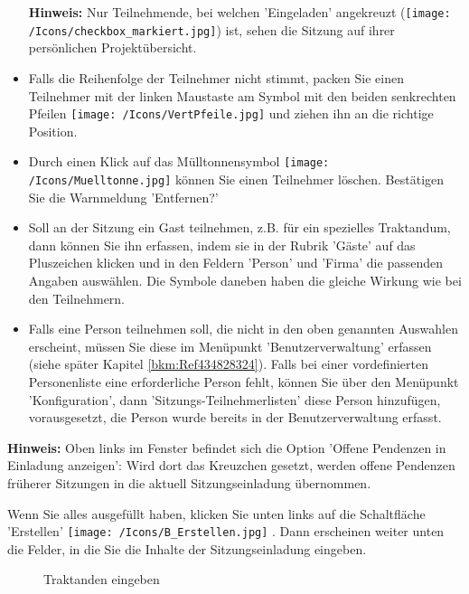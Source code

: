 \begin{itemize}
\textbf{Hinweis:} Nur Teilnehmende, bei welchen 'Eingeladen' angekreuzt (\texttt{[image: /Icons/checkbox\_markiert.jpg]}) ist, sehen die Sitzung auf ihrer persönlichen Projektübersicht.
\item 
Falls die Reihenfolge der Teilnehmer nicht stimmt, packen Sie einen Teilnehmer mit der linken Maustaste am Symbol mit den beiden senkrechten Pfeilen \texttt{[image: /Icons/VertPfeile.jpg]}  und ziehen ihn an die richtige Position.
\item 
Durch einen Klick auf das Mülltonnensymbol \texttt{[image: /Icons/Muelltonne.jpg]}  können Sie einen Teilnehmer löschen. Bestätigen Sie die Warnmeldung 'Entfernen?'
\item 
Soll an der Sitzung ein Gast teilnehmen, z.B. für ein spezielles Traktandum, dann können Sie ihn erfassen, indem sie in der Rubrik 'Gäste' auf das Pluszeichen klicken und in den Feldern 'Person' und 'Firma' die passenden Angaben auswählen. Die Symbole daneben haben die gleiche Wirkung wie bei den Teilnehmern.
\item 
Falls eine Person teilnehmen soll, die nicht in den oben genannten Auswahlen erscheint, müssen Sie diese im Menüpunkt 'Benutzerverwaltung' erfassen (siehe später Kapitel \ref{bkm:Ref434828324}). Falls bei einer vordefinierten Personenliste eine erforderliche Person fehlt, können Sie über den Menüpunkt 'Konfiguration', dann 'Sitzungs-Teilnehmerlisten' diese Person hinzufügen, vorausgesetzt, die Person wurde bereits in der Benutzerverwaltung erfasst.
\end{itemize}

\vspace{\baselineskip}

\textbf{Hinweis:} Oben links im Fenster befindet sich die Option 'Offene Pendenzen in Einladung anzeigen': Wird dort das Kreuzchen gesetzt, werden offene Pendenzen früherer Sitzungen in die aktuell Sitzungseinladung übernommen.

\vspace{\baselineskip}

Wenn Sie alles ausgefüllt haben, klicken Sie unten links auf die Schaltfläche 'Erstellen' \texttt{[image: /Icons/B\_Erstellen.jpg]} . Dann erscheinen weiter unten die Felder, in die Sie die Inhalte der Sitzungseinladung eingeben.

\begin{figure}[H]
\caption{Traktanden eingeben}
\end{figure}


